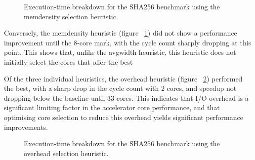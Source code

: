 \documentclass{UoYCSproject}
\begin{document}
\begin{figure}[H]
\caption{Execution-time breakdown for the SHA256 benchmark using the memdensity selection heuristic.}
\label{fig:breakdownMemDensitySHA256}
\end{figure}

Conversely, the memdensity heuristic (figure ~\ref{fig:breakdownMemDensitySHA256})
did not show a performance improvement until the 8-core mark, with
the cycle count sharply dropping at this point. This shows that, unlike the avgwidth heuristic, this heuristic
does not initially select the cores that offer the best

Of the three individual heuristics, the overhead heuristic (figure ~\ref{fig:breakdownOverheadSHA256})
performed the best, with a sharp drop in the cycle count
with 2 cores, and speedup not dropping below the baseline until 33 cores. This indicates that I/O overhead is a significant
limiting factor in the accelerator core performance, and that optimising core selection to reduce this overhead yields
significant performance improvements.

\begin{figure}[H]
\caption{Execution-time breakdown for the SHA256 benchmark using the overhead selection heuristic.}
\label{fig:breakdownOverheadSHA256}
\end{figure}
\end{document}
